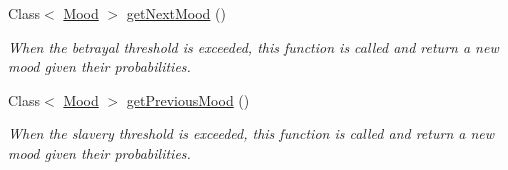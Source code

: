 \begin{DoxyCompactItemize}
Class$<$ \hyperlink{a00015}{Mood} $>$ \hyperlink{a00015_aa0080ad0116bb5b614bbbc56d448ad22}{get\-Next\-Mood} ()
\begin{DoxyCompactList}\small\item\em When the betrayal threshold is exceeded, this function is called and return a new mood given their probabilities. \end{DoxyCompactList}\item 
Class$<$ \hyperlink{a00015}{Mood} $>$ \hyperlink{a00015_aceaadc827da68781c215cf280a8062f8}{get\-Previous\-Mood} ()
\begin{DoxyCompactList}\small\item\em When the slavery threshold is exceeded, this function is called and return a new mood given their probabilities. \end{DoxyCompactList}\end{DoxyCompactItemize}
